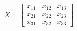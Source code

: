     \begin{center}
        \begin{equation*}
            X =
            \begin{bmatrix}
                x_{11} & x_{12} & x_{13} \\
                x_{21} & x_{22} & x_{23} \\
                x_{31} & x_{32} & x_{33}
            \end{bmatrix}
        \end{equation*}
    \end{center}

